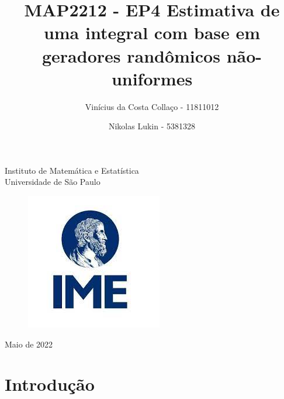 \documentclass{article}
\title{MAP2212 - EP4 Estimativa de uma integral com base em geradores randômicos não-uniformes}
\author{Vinícius da Costa Collaço - 11811012 \and Nikolas Lukin - 5381328}
\begin{document}
\setlength{\parindent}{1cm} 
\maketitle
\begin{center}
\Large{Instituto de Matemática e Estatística}\\
\Large{Universidade de São Paulo}\\
\begin{figure}[htp]
  \centering
  \includegraphics[scale=1]{Imagens/IME.jpg}
  \label{fig:IME}
\end{figure}
\Large{Maio de 2022}
\end{center}
\pagebreak
\tableofcontents
\pagebreak

\maketitle

\section{Introdução}
\end{document}
